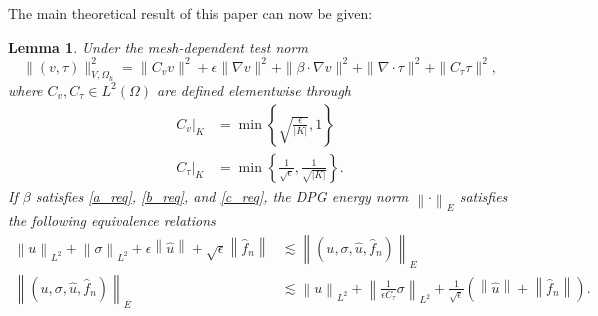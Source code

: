 \documentclass[11pt,onecolumn]{scrartcl}
\newcommand{\nor}[1]{\left\| #1 \right\|}
\newcommand{\Oh}{\Omega_h}
\newcommand{\grad}{\nabla}
\renewcommand{\div}{\grad \cdot}
\newtheorem{lemma}{Lemma}
\begin{document}
The main theoretical result of this paper can now be given:
\begin{lemma}
Under the mesh-dependent test norm
\[
\|\left(v,\tau\right)\|_{V,\Oh}^2 = \|C_vv\|^2 + \epsilon \|\grad v\|^2 + \|\beta \cdot \grad v\|^2 + \| \div \tau\|^2 + \|C_\tau\tau\|^2,
\]
where $C_v, C_{\tau}\in L^2(\Omega)$ are defined elementwise through
\begin{align*}
\left.C_v\right |_K &= \min\left\{\sqrt{\frac{\epsilon}{|K|}},1\right\}\\
\left.C_{\tau}\right |_K &= \min\left\{\frac{1}{\sqrt{\epsilon}},\frac{1}{\sqrt{|K|}}\right\}.
\end{align*}
If $\beta$ satisfies \eqref{a_req}, \eqref{b_req}, and \eqref{c_req}, the DPG energy norm $\nor{\cdot}_E$ satisfies the following equivalence relations
\begin{align*}
\nor{u}_{L^2} + \nor{\sigma}_{L^2} + \epsilon\nor{\widehat{u}} + \sqrt{\epsilon}\nor{\widehat{f}_n} 
&\lesssim \nor{\left(u,\sigma, \widehat{u},\widehat{f}_n\right)}_E \\ 
\nor{\left(u,\sigma, \widehat{u},\widehat{f}_n\right)}_E &\lesssim \nor{u}_{L^2} + \nor{\frac{1}{\epsilon C_\tau} \sigma}_{L^2} + \frac{1}{\sqrt{\epsilon}} \left(\nor{\widehat{u}} + \nor{\widehat{f}_n}\right).
\end{align*}
\end{lemma}
\end{document}
